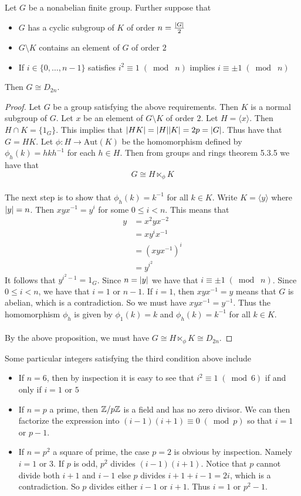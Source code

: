 \documentclass[a4paper]{article}
\begin{document}
\begin{thm}{}{} Let $G$ be a nonabelian finite group. Further suppose that 
\begin{itemize}
\item $G$ has a cyclic subgroup of $K$ of order $n=\frac{\abs{G}}{2}$
\item $G\setminus K$ contains an element of $G$ of order $2$
\item If $i\in\{0,\dots,n-1\}$ satisfies $i^2\equiv 1\;(\bmod\; n)$ implies $i\equiv \pm 1\;(\bmod\; n)$
\end{itemize}
Then $G\cong D_{2n}$. \tcbline
\begin{proof}
Let $G$ be a group satisfying the above requirements. Then $K$ is a normal subgroup of $G$. Let $x$ be an element of $G\setminus K$ of order $2$. Let $H=\langle x\rangle$. Then $H\cap K=\{1_G\}$. This implies that $\abs{HK}=\abs{H}\abs{K}=2p=\abs{G}$. Thus have that $G=HK$. Let $\phi:H\to\text{Aut}(K)$ be the homomorphism defined by $\phi_h(k)=hkh^{-1}$ for each $h\in H$. Then from groups and rings theorem 5.3.5 we have that $$G\cong H\ltimes_\phi K$$~\\

The next step is to show that $\phi_h(k)=k^{-1}$ for all $k\in K$. Write $K=\langle y\rangle$ where $\abs{y}=n$. Then $xyx^{-1}=y^i$ for some $0\leq i<n$. This means that 
\begin{align*}
y&=x^2yx^{-2}\tag{$x^2=1$}\\
&=xy^ix^{-1}\\
&=(xyx^{-1})^i\\
&=y^{i^2}
\end{align*}
It follows that $y^{i^2-1}=1_G$. Since $n=\abs{y}$ we have that $i\equiv\pm1\;(\bmod\;n)$. Since $0\leq i<n$, we have that $i=1$ or $n-1$. If $i=1$, then $xyx^{-1}=y$ means that $G$ is abelian, which is a contradiction. So we must have $xyx^{-1}=y^{-1}$. Thus the homomorphism $\phi_h$ is given by $\phi_1(k)=k$ and $\phi_h(k)=k^{-1}$ for all $k\in K$. \\~\\

By the above proposition, we must have $G\cong H\ltimes_\phi K\cong D_{2n}$. 
\end{proof}
\end{thm}

Some particular integers satisfying the third condition above include
\begin{itemize}
\item If $n=6$, then by inspection it is easy to see that $i^2\equiv 1\;(\bmod 6)$ if and only if $i=1$ or $5$
\item If $n=p$ a prime, then $\mathbb{Z}/p\mathbb{Z}$ is a field and has no zero divisor. We can then factorize the expression into $(i-1)(i+1)\equiv 0\;(\bmod p)$ so that $i=1$ or $p-1$. 
\item If $n=p^2$ a square of prime, the case $p=2$ is obvious by inspection. Namely $i=1$ or $3$. If $p$ is odd, $p^2$ divides $(i-1)(i+1)$. Notice that $p$ cannot divide both $i+1$ and $i-1$ else $p$ divides $i+1+i-1=2i$, which is a contradiction. So $p$ divides either $i-1$ or $i+1$. Thus $i=1$ or $p^2-1$. 
\end{itemize}
\end{document}
